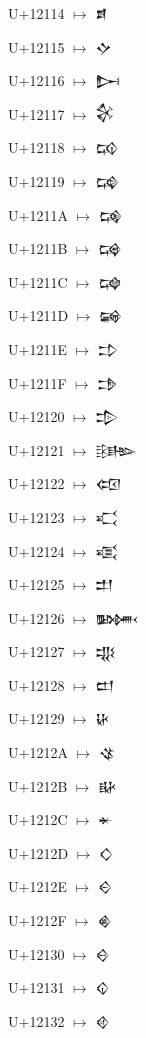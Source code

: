 {\noindent U+12114  $\mapsto$ {\cufont 𒄔}\par
\noindent U+12115  $\mapsto$ {\cufont 𒄕}\par
\noindent U+12116  $\mapsto$ {\cufont 𒄖}\par
\noindent U+12117  $\mapsto$ {\cufont 𒄗}\par
\noindent U+12118  $\mapsto$ {\cufont 𒄘}\par
\noindent U+12119  $\mapsto$ {\cufont 𒄙}\par
\noindent U+1211A  $\mapsto$ {\cufont 𒄚}\par
\noindent U+1211B  $\mapsto$ {\cufont 𒄛}\par
\noindent U+1211C  $\mapsto$ {\cufont 𒄜}\par
\noindent U+1211D  $\mapsto$ {\cufont 𒄝}\par
\noindent U+1211E  $\mapsto$ {\cufont 𒄞}\par
\noindent U+1211F  $\mapsto$ {\cufont 𒄟}\par
\noindent U+12120  $\mapsto$ {\cufont 𒄠}\par
\noindent U+12121  $\mapsto$ {\cufont 𒄡}\par
\noindent U+12122  $\mapsto$ {\cufont 𒄢}\par
\noindent U+12123  $\mapsto$ {\cufont 𒄣}\par
\noindent U+12124  $\mapsto$ {\cufont 𒄤}\par
\noindent U+12125  $\mapsto$ {\cufont 𒄥}\par
\noindent U+12126  $\mapsto$ {\cufont 𒄦}\par
\noindent U+12127  $\mapsto$ {\cufont 𒄧}\par
\noindent U+12128  $\mapsto$ {\cufont 𒄨}\par
\noindent U+12129  $\mapsto$ {\cufont 𒄩}\par
\noindent U+1212A  $\mapsto$ {\cufont 𒄪}\par
\noindent U+1212B  $\mapsto$ {\cufont 𒄫}\par
\noindent U+1212C  $\mapsto$ {\cufont 𒄬}\par
\noindent U+1212D  $\mapsto$ {\cufont 𒄭}\par
\noindent U+1212E  $\mapsto$ {\cufont 𒄮}\par
\noindent U+1212F  $\mapsto$ {\cufont 𒄯}\par
\noindent U+12130  $\mapsto$ {\cufont 𒄰}\par
\noindent U+12131  $\mapsto$ {\cufont 𒄱}\par
\noindent U+12132  $\mapsto$ {\cufont 𒄲}\par
}
